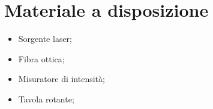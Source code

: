 \section{Materiale a disposizione}

\begin{itemize}
	\item{Sorgente laser;}
    	\item{Fibra ottica;}
	\item{Misuratore di intensità;}
	\item{Tavola rotante;}
\end{itemize}
